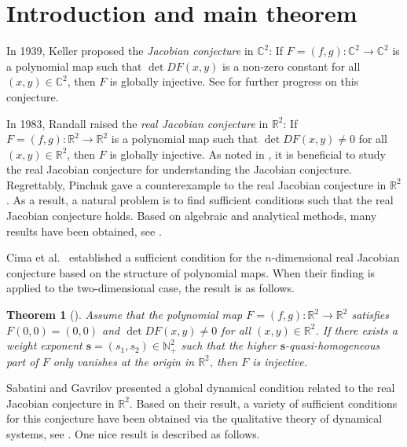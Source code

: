 \documentclass[10pt,a4paper]{amsart}
\numberwithin{equation}{section}
\newtheorem{theorem}[theo]{Theorem}
\begin{document}
\section{Introduction and main theorem}

In 1939, Keller \cite{bib 18} proposed the \emph{Jacobian conjecture} in
$\mathbb{C}^2$: If $F=(f,g):\mathbb{C}^2 \to \mathbb{C}^2$ is a polynomial map such 
that $ \det DF(x,y)$ is a non-zero constant for all $(x,y)\in \mathbb{C}^2$, 
then $ F $ is globally injective. See \cite{bib 4, bib 24, bib 26, bib 27} for 
further progress on this conjecture.

In 1983, Randall \cite{bib 22} raised the \emph{real Jacobian conjecture} in 
$\mathbb{R}^2$: If $F=(f,g):\mathbb{R}^2 \to \mathbb{R}^2$ is a polynomial map such 
that $ \det DF(x,y)\neq 0 $ for all $(x,y)\in \mathbb{R}^2$, then $ F $ is globally 
injective. As noted in \cite{bib 12,bib 26},  it is  beneficial to study the real 
Jacobian conjecture for understanding the Jacobian conjecture. Regrettably, 
Pinchuk \cite{bib 21} gave a counterexample to the real Jacobian conjecture in 
$\mathbb{R}^2$. As a result, a natural problem is to find sufficient conditions such 
that the real Jacobian conjecture holds. Based on algebraic and analytical methods, 
many results have been obtained, see \cite{bib 28, bib 6, bib 9, bib 13, bib 15, bib 17}. 

Cima et al.\ \cite{bib 11, bib 12} established a sufficient condition for the 
$n$-dimensional real Jacobian conjecture based on the structure of polynomial maps. 
When their finding is applied to the two-dimensional case, the result is as follows.

\begin{theorem}[\cite{bib 12}] \label{th1.1}
Assume that the polynomial map $F=(f,g):\mathbb{R}^2 \to \mathbb{R}^2$ satisfies 
$ F(0,0)=(0,0) $ and $ \det DF(x,y)\neq 0 $ for all $ (x,y)\in \mathbb{R}^2 $. 
If there exists a weight exponent $\mathbf{s}=(s_1,s_2)\in \mathbb{N}_{+}^{2}$
such that the higher $\mathbf{s}$-quasi-homogeneous part of $F$ only vanishes at 
the origin in $\mathbb{R}^2$, then $F$ is injective.
\end{theorem}

Sabatini \cite{bib 23} and Gavrilov \cite{bib 16} presented a global dynamical condition 
related to the real Jacobian conjecture in \(\mathbb{R}^2\). 
Based on their result, a variety of sufficient conditions for this conjecture 
have been obtained via the qualitative theory of dynamical systems, 
see \cite{bib 7, bib 8, bib 10, bib 20, bib 25}. 
One nice result is described as follows.
\end{document}

